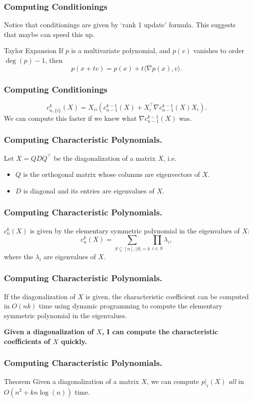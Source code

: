 \documentclass{beamer}
\begin{document}
\begin{frame}
    \frametitle{Computing Conditionings}
    Notice that conditionings are given by `rank 1 update' formula. This suggests that maybe can speed this up.

    \begin{block}{Taylor Expansion}
        If $p$ is a multivariate polynomial, and $p(v)$ vanishes to order $\deg(p) - 1$, then
        \[
            p(x + tv) = p(x) + t \langle \nabla p(x), v\rangle.
        \]
    \end{block}
\end{frame}
\begin{frame}
    \frametitle{Computing Conditionings}
    \[
        c_{n,\{i\}}^k(X) = X_{ii} (c_{n-1}^{k-1}(X) + X_i^{\intercal}\nabla c_{n-1}^{k-1}(X)X_i).
    \]
    We can compute this faster if we knew what $\nabla c_{n-1}^{k-1}(X)$ was.
\end{frame}
\begin{frame}
    \frametitle{Computing Characteristic Polynomials.}
    Let $X = QDQ^{\intercal}$ be the diagonalization of a matrix $X$, i.e.
    \begin{itemize}
        \item $Q$ is the orthogonal matrix whose columns are eigenvectors of $X$.
        \item $D$ is diagonal and its entries are eigenvalues of $X$.
    \end{itemize}
\end{frame}
\begin{frame}
    \frametitle{Computing Characteristic Polynomials.}
    $c_n^k(X)$ is given by the elementary symmetric polynomial in the eigenvalues of $X$:
    \[
        c_n^k(X) = \sum_{S \subseteq [n],|S| = k} \prod_{i \in S}\lambda_i,
    \]
    where the $\lambda_i$ are eigenvalues of $X$.
\end{frame}
\begin{frame}
    \frametitle{Computing Characteristic Polynomials.}
    If the diagonalization of $X$ is given, the characteristic coefficient can be computed in $O(nk)$ time using dynamic programming to compute the elementary symmetric polynomial in the eigenvalues.

    \textbf{Given a diagonalization of $X$, I can compute the characteristic coefficients of $X$ quickly.}
\end{frame}
\begin{frame}
    \frametitle{Computing Characteristic Polynomials.}
    \begin{block}{Theorem}
        Given a diagonalization of a matrix $X$, we can compute $p|_i(X)$  \emph{all} in $O(n^2 + kn\log(n))$ time.
    \end{block}
\end{frame}
\end{document}
